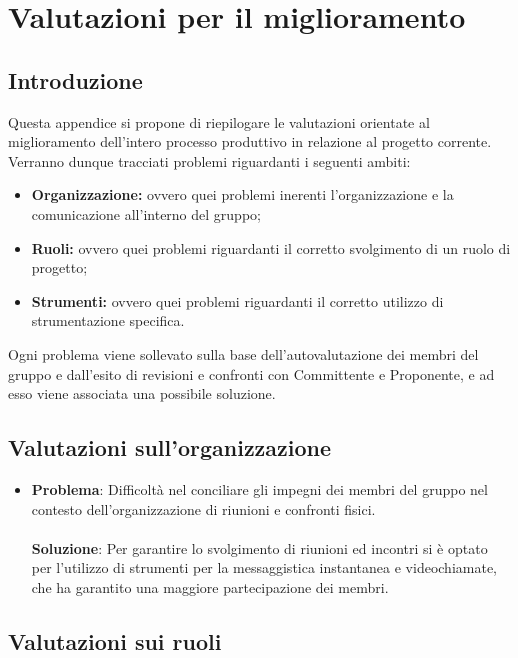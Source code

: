 \documentclass[openany,12pt,a4paper]{report}
\begin{document}
\chapter{Valutazioni per il miglioramento}

\section{Introduzione}

Questa appendice si propone di riepilogare le valutazioni orientate al miglioramento dell'intero processo produttivo in relazione al progetto corrente. Verranno dunque tracciati problemi riguardanti i seguenti ambiti:

\begin{itemize}
	\item \textbf{Organizzazione:} ovvero quei problemi inerenti l'organizzazione e la comunicazione all'interno del gruppo;
	\item \textbf{Ruoli:} ovvero quei problemi riguardanti il corretto svolgimento di un ruolo di progetto;
	\item \textbf{Strumenti:} ovvero quei problemi riguardanti il corretto utilizzo di strumentazione specifica.
\end{itemize}

\noindent Ogni problema viene sollevato sulla base dell'autovalutazione dei membri del gruppo e dall'esito di revisioni e confronti con Committente e Proponente, e ad esso viene associata una possibile soluzione.

\section{Valutazioni sull'organizzazione}
\begin{itemize}
	\item \textbf{Problema}: Difficoltà nel conciliare gli impegni dei membri del gruppo nel contesto dell'organizzazione di riunioni e confronti fisici. \\ \\
	\textbf{Soluzione}: Per garantire lo svolgimento di riunioni ed incontri si è optato per l'utilizzo di strumenti per la messaggistica instantanea e videochiamate, che ha garantito una maggiore partecipazione dei membri.
\end{itemize}

\section{Valutazioni sui ruoli}
\end{document}
